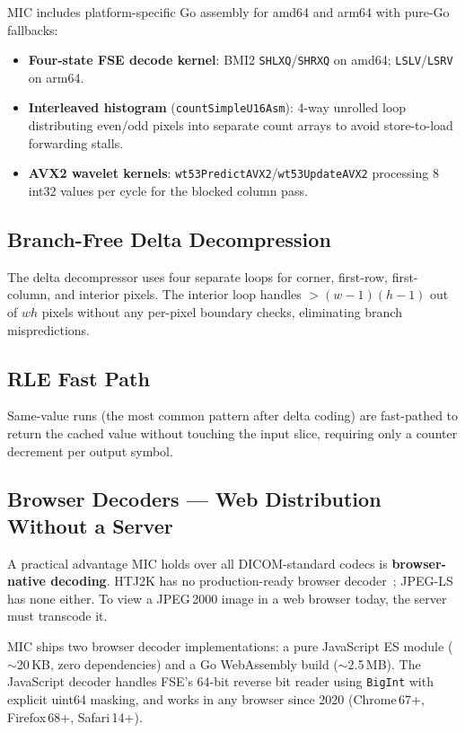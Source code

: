 \documentclass[10pt,twocolumn]{article}
\begin{document}
MIC includes platform-specific Go assembly for amd64 and arm64 with pure-Go fallbacks:

\begin{itemize}
  \item \textbf{Four-state FSE decode kernel}: BMI2 \texttt{SHLXQ}/\texttt{SHRXQ} on amd64; \texttt{LSLV}/\texttt{LSRV} on arm64.
  \item \textbf{Interleaved histogram} (\texttt{countSimpleU16Asm}): 4-way unrolled loop distributing even/odd pixels into separate count arrays to avoid store-to-load forwarding stalls.
  \item \textbf{AVX2 wavelet kernels}: \texttt{wt53PredictAVX2}/\texttt{wt53UpdateAVX2} processing 8 int32 values per cycle for the blocked column pass.
\end{itemize}

\subsection{Branch-Free Delta Decompression}

The delta decompressor uses four separate loops for corner, first-row, first-column, and interior pixels. The interior loop handles $>(w-1)(h-1)$ out of $wh$ pixels without any per-pixel boundary checks, eliminating branch mispredictions.

\subsection{RLE Fast Path}

Same-value runs (the most common pattern after delta coding) are fast-pathed to return the cached value without touching the input slice, requiring only a counter decrement per output symbol.

\subsection{Browser Decoders --- Web Distribution Without a Server}
\label{sec:browser}

A practical advantage MIC holds over all DICOM-standard codecs is \textbf{browser-native decoding}. HTJ2K has no production-ready browser decoder~\cite{nohtj2kwasm}; JPEG-LS has none either. To view a JPEG\,2000 image in a web browser today, the server must transcode it.

MIC ships two browser decoder implementations: a pure JavaScript ES module ($\sim$20\,KB, zero dependencies) and a Go WebAssembly build ($\sim$2.5\,MB). The JavaScript decoder handles FSE's 64-bit reverse bit reader using \texttt{BigInt} with explicit uint64 masking, and works in any browser since 2020 (Chrome\,67+, Firefox\,68+, Safari\,14+).
\end{document}
